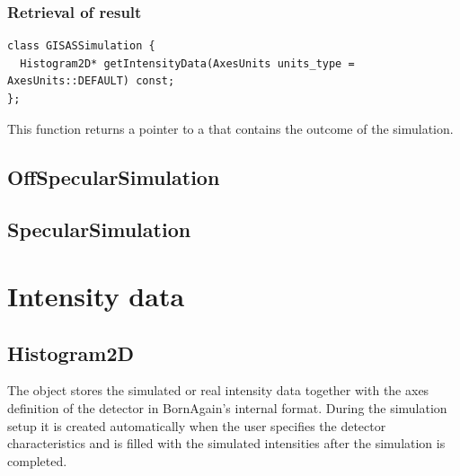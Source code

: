 \subsubsection{Retrieval of result}
\begin{lstlisting}
class GISASSimulation {
  Histogram2D* getIntensityData(AxesUnits units_type = AxesUnits::DEFAULT) const;
};
\end{lstlisting}
%
This function returns a pointer to a 
that contains the outcome of the simulation.

\subsection{Off\-Specular\-Simulation}

\MissingSection

\subsection{Specular\-Simulation}

\MissingSection

\section{Intensity data}

\MissingSection
\iffalse

\subsection{Histogram2D}\label{SRefHis2D}


The  object stores the
simulated or real intensity data together with the axes definition of the detector in BornAgain's internal format.
During the simulation setup
it is created automatically when the user specifies the detector characteristics and is filled with the simulated intensities after the simulation is completed.

